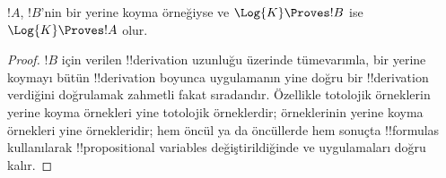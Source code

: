 \begin{prop}
  $!A$, $!B$'nin bir yerine koyma örneğiyse ve $\Log{K} \Proves !B$ ise
  $\Log{K} \Proves !A$ olur.
\end{prop}

\begin{proof}
  $!B$ için verilen !!{derivation} uzunluğu üzerinde tümevarımla, bir yerine
  koymayı bütün !!{derivation} boyunca uygulamanın yine doğru bir !!{derivation}
  verdiğini doğrulamak zahmetli fakat sıradandır. Özellikle totolojik
  örneklerin yerine koyma örnekleri yine totolojik örneklerdir;
   örneklerinin yerine koyma örnekleri
  yine  örnekleridir; hem öncül ya da
  öncüllerde hem sonuçta !!{formula}s kullanılarak !!{propositional variable}s
  değiştirildiğinde \MP{} ve \Nec{} uygulamaları doğru kalır.
\end{proof}


